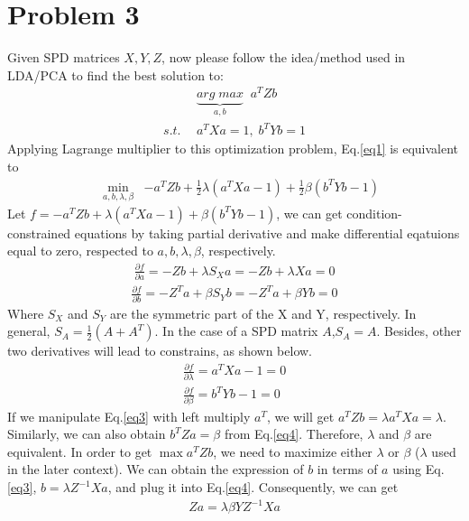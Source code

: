 \documentclass[11pt]{article}
\begin{document}
\section*{Problem 3}
Given SPD matrices $X, Y, Z$, now please follow the idea/method used in LDA/PCA to find the best solution to:
\begin{equation}\label{eq1}
\begin{aligned}
&\underbrace{arg\;max}_{a,b}\;\;{a^TZb}\\
s.t. \ \ &a^TXa =1,\; b^TYb =1
\end{aligned}
\end{equation}
Applying Lagrange multiplier to this optimization problem, Eq.\ref{eq1} is equivalent to
\begin{align}\label{eq2}
&\min_{a,b,\lambda,\beta}\;\;{-a^TZb+\frac{1}{2}\lambda\left(a^TXa-1\right)+\frac{1}{2}\beta\left(b^TYb-1\right)}
\end{align}
Let $f=-a^TZb+\lambda\left(a^TXa-1\right)+\beta\left(b^TYb-1\right)$, we can get condition-constrained equations by taking partial derivative and make differential eqatuions equal to zero, respected to $a,b,\lambda,\beta$, respectively.
\begin{align}\label{eq3}
\frac{\partial f}{\partial a}=-Zb+\lambda S_Xa=-Zb+\lambda Xa=0
\end{align}
\begin{align}\label{eq4}
\frac{\partial f}{\partial b}=-Z^Ta+\beta S_Yb=-Z^Ta+\beta Yb=0
\end{align}
Where $S_X$ and $S_Y$ are the symmetric part of the X and Y, respectively. In general, $S_A=\frac{1}{2}\left(A+A^T\right)$. In the case of a SPD matrix $A$,$S_A=A$. Besides, other two derivatives will lead to constrains, as shown below.
\begin{align*}
\frac{\partial f}{\partial \lambda}=a^TXa-1=0\\
\frac{\partial f}{\partial \beta}=b^TYb-1=0
\end{align*}
If we manipulate Eq.\ref{eq3} with left multiply $a^T$, we will get $a^TZb=\lambda a^TXa=\lambda$. Similarly, we can also obtain $b^TZa=\beta$ from Eq.\ref{eq4}. Therefore, $\lambda$ and $\beta$ are equivalent. In order to get $\max a^TZb$, we need to maximize either $\lambda$ or $\beta$ ($\lambda$ used in the later context).
We can obtain the expression of $b$ in terms of $a$ using Eq.\ref{eq3}, $b=\lambda Z^{-1}Xa$, and plug it into Eq.\ref{eq4}. Consequently, we can get
\begin{align*}
Za=\lambda\beta YZ^{-1}Xa
\end{align*}
\end{document}
